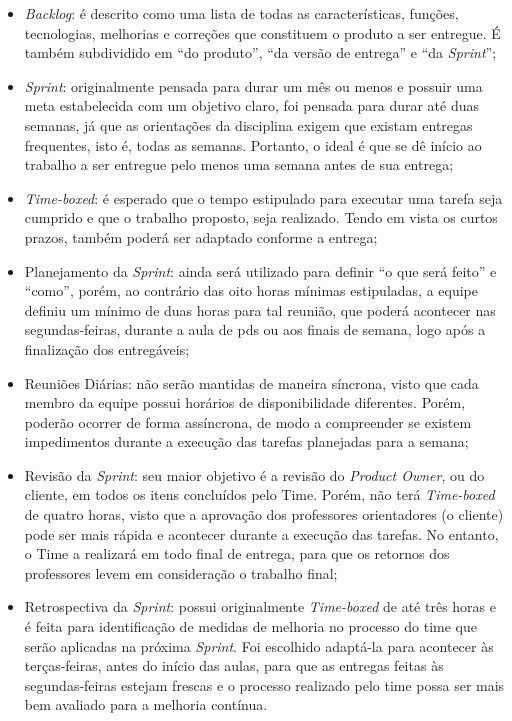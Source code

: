 \begin{itemize}
\item \textsl{Backlog}: é descrito como uma lista de todas as características, funções, tecnologias, melhorias e correções que constituem o produto a ser entregue. É também subdividido em ``do produto'', ``da versão de entrega'' e ``da \textsl{Sprint}'';

\item \textsl{Sprint}: originalmente pensada para durar um mês ou menos e possuir uma meta estabelecida com um objetivo claro, foi pensada 
para durar até duas semanas, já que as orientações da disciplina exigem que existam entregas frequentes, isto é, todas as semanas. Portanto, o ideal é que se dê início ao trabalho a ser entregue pelo menos uma semana antes de sua entrega;

\item \textsl{Time-boxed}: é esperado que o tempo estipulado para executar uma tarefa seja cumprido e que o trabalho proposto, seja realizado. Tendo em vista os curtos prazos,
também poderá ser adaptado conforme a entrega;

\item Planejamento da \textsl{Sprint}: ainda será utilizado para definir ``o que será feito'' e ``como'', porém, ao contrário das oito horas mínimas 
estipuladas, a equipe definiu um mínimo de duas horas para tal reunião, que poderá acontecer nas segundas-feiras, durante a aula de \acs{pds} ou aos finais de semana, logo após a finalização dos entregáveis;

\item Reuniões Diárias: não serão mantidas de maneira síncrona, visto que cada membro da equipe possui horários de disponibilidade diferentes. Porém, poderão ocorrer de forma assíncrona, de modo a compreender se existem impedimentos durante a execução das tarefas planejadas para a semana;

\item Revisão da \textsl{Sprint}: seu maior objetivo é a revisão do \textsl{Product Owner}, ou do cliente, em todos os itens concluídos pelo Time. Porém, 
não terá \textsl{Time-boxed} de quatro horas, visto que a aprovação dos professores orientadores (o cliente) pode ser mais rápida e acontecer durante a execução das tarefas. No entanto, o Time a realizará em todo final de entrega, para que os retornos dos professores levem em consideração o trabalho final;

\item Retrospectiva da \textsl{Sprint}: possui originalmente \textsl{Time-boxed} de até três horas e é feita para identificação 
de medidas de melhoria no processo do time que serão aplicadas na próxima \textsl{Sprint}. Foi escolhido adaptá-la para acontecer às terças-feiras, antes do início das aulas, para que as entregas feitas às segundas-feiras estejam frescas e o processo realizado pelo time possa ser mais bem avaliado para a melhoria contínua.
\end{itemize}

